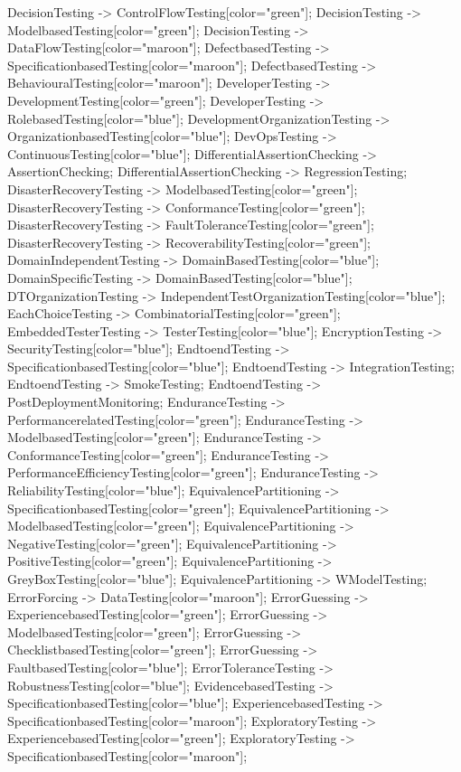 \documentclass{article}
\begin{document}
{DecisionTesting -> ControlFlowTesting[color="green"];
DecisionTesting -> ModelbasedTesting[color="green"];
DecisionTesting -> DataFlowTesting[color="maroon"];
DefectbasedTesting -> SpecificationbasedTesting[color="maroon"];
DefectbasedTesting -> BehaviouralTesting[color="maroon"];
DeveloperTesting -> DevelopmentTesting[color="green"];
DeveloperTesting -> RolebasedTesting[color="blue"];
DevelopmentOrganizationTesting -> OrganizationbasedTesting[color="blue"];
DevOpsTesting -> ContinuousTesting[color="blue"];
DifferentialAssertionChecking -> AssertionChecking;
DifferentialAssertionChecking -> RegressionTesting;
DisasterRecoveryTesting -> ModelbasedTesting[color="green"];
DisasterRecoveryTesting -> ConformanceTesting[color="green"];
DisasterRecoveryTesting -> FaultToleranceTesting[color="green"];
DisasterRecoveryTesting -> RecoverabilityTesting[color="green"];
DomainIndependentTesting -> DomainBasedTesting[color="blue"];
DomainSpecificTesting -> DomainBasedTesting[color="blue"];
DTOrganizationTesting -> IndependentTestOrganizationTesting[color="blue"];
EachChoiceTesting -> CombinatorialTesting[color="green"];
EmbeddedTesterTesting -> TesterTesting[color="blue"];
EncryptionTesting -> SecurityTesting[color="blue"];
EndtoendTesting -> SpecificationbasedTesting[color="blue"];
EndtoendTesting -> IntegrationTesting;
EndtoendTesting -> SmokeTesting;
EndtoendTesting -> PostDeploymentMonitoring;
EnduranceTesting -> PerformancerelatedTesting[color="green"];
EnduranceTesting -> ModelbasedTesting[color="green"];
EnduranceTesting -> ConformanceTesting[color="green"];
EnduranceTesting -> PerformanceEfficiencyTesting[color="green"];
EnduranceTesting -> ReliabilityTesting[color="blue"];
EquivalencePartitioning -> SpecificationbasedTesting[color="green"];
EquivalencePartitioning -> ModelbasedTesting[color="green"];
EquivalencePartitioning -> NegativeTesting[color="green"];
EquivalencePartitioning -> PositiveTesting[color="green"];
EquivalencePartitioning -> GreyBoxTesting[color="blue"];
EquivalencePartitioning -> WModelTesting;
ErrorForcing -> DataTesting[color="maroon"];
ErrorGuessing -> ExperiencebasedTesting[color="green"];
ErrorGuessing -> ModelbasedTesting[color="green"];
ErrorGuessing -> ChecklistbasedTesting[color="green"];
ErrorGuessing -> FaultbasedTesting[color="blue"];
ErrorToleranceTesting -> RobustnessTesting[color="blue"];
EvidencebasedTesting -> SpecificationbasedTesting[color="blue"];
ExperiencebasedTesting -> SpecificationbasedTesting[color="maroon"];
ExploratoryTesting -> ExperiencebasedTesting[color="green"];
ExploratoryTesting -> SpecificationbasedTesting[color="maroon"];
}
\end{document}

